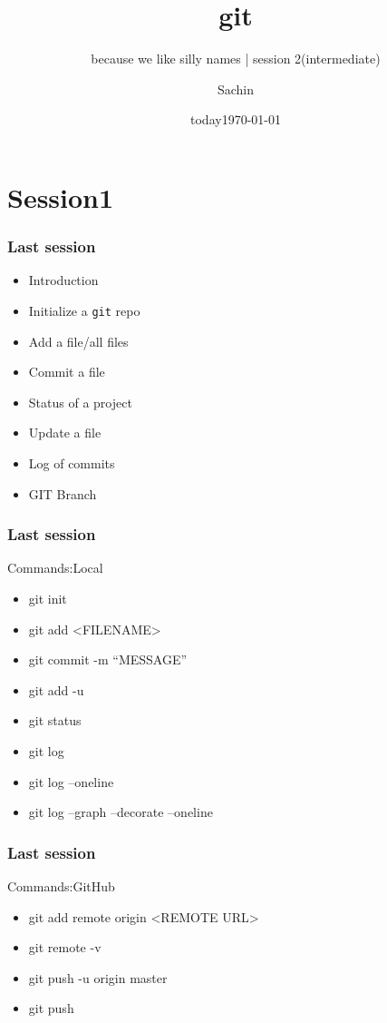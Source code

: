 \documentclass[bigger, presentation]{beamer}
\date{today}
\subtitle{because we like silly names | session 2(intermediate)}
\institute{Indian Institute of Technology Bombay}
\title{git}
\author{Sachin}
\date{\today}
\begin{document}
\maketitle

\section{Session1}
\label{sec-1}
\begin{frame}
\frametitle{Last session}
\label{sec-1-1}


\begin{itemize}
\item Introduction
\item Initialize a \texttt{git} repo
\item Add a file/all files
\item Commit a file
\item Status of a project
\item Update a file
\item Log of commits
\item GIT Branch
\end{itemize}
\end{frame}
\begin{frame}
\frametitle{Last session}
\label{sec-1-2}
\begin{block}{Commands:Local}
\label{sec-1-2-1}

\begin{itemize}
\item git init
\item git add <FILENAME>
\item git commit -m ``MESSAGE''
\item git add -u
\item git status
\item git log
\item git log --oneline
\item git log --graph --decorate --oneline
\end{itemize}
\end{block}
\end{frame}
\begin{frame}
\frametitle{Last session}
\label{sec-1-3}
\begin{block}{Commands:GitHub}
\label{sec-1-3-1}

\begin{itemize}
\item git add remote origin <REMOTE URL>
\item git remote -v
\item git push -u origin master
\item git push
\end{itemize}
\end{block}
\end{frame}
\end{document}

